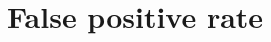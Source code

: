 \documentclass[ ../main.tex]{subfiles}
\begin{document}
\section{False positive rate}
\label{sec:fpr}
\end{document}
